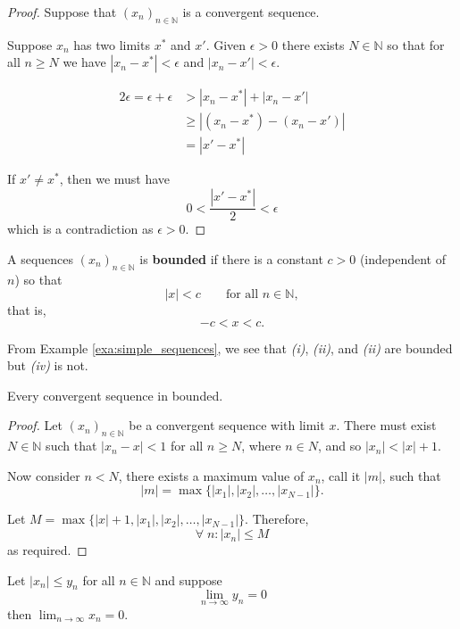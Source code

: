 \begin{proof}
    Suppose that $(x_n)_{n\in\mathbb N}$ is a convergent sequence.
    
    Suppose $x_n$ has two limits $x^*$ and $x'$. Given $\epsilon>0$ there exists $N\in\mathbb N$ so that for all $n\geq N$ we have $|x_n-x^*|<\epsilon$ and $|x_n-x'|<\epsilon$.
    
    \begin{align*}
        2\epsilon=\epsilon+\epsilon&>|x_n-x^*|+|x_n-x'|\\
        &\geq|(x_n-x^*)-(x_n-x')|\\
        &=|x'-x^*|
    \end{align*}
    
    If $x'\neq x^*$, then we must have \[0<\dfrac{|x'-x^*|}{2}<\epsilon\] which is a contradiction as $\epsilon>0$.
\end{proof}

\begin{definition}
    A sequences $(x_n)_{n\in\mathbb N}$ is \textbf{bounded} if there is a constant $c>0$ (independent of $n$) so that \[|x|<c\qquad \text{for all } n\in\mathbb N,\] that is, \[-c<x<c.\]
\end{definition}

From Example \ref{exa:simple_sequences}, we see that \emph{(i)}, \emph{(ii)}, and \emph{(ii)} are bounded but \emph{(iv)} is not.

\begin{theorem}
    Every convergent sequence in bounded.
\end{theorem}

\begin{proof}
    Let $(x_n)_{n\in\mathbb N}$ be a convergent sequence with limit $x$. There must exist $N\in\mathbb N$ such that $|x_n-x|<1$ for all $n\geq N$, where $n\in N$, and so $|x_n|<|x|+1$.
    
    Now consider $n<N$, there exists a maximum value of $x_n$, call it $|m|$, such that \[|m|=\max{\{|x_1|,|x_2|,\ldots,|x_{N-1}|\}}.\]
    
        Let $M=\max{\{|x|+1,|x_1|,|x_2|,\ldots,|x_{N-1}|\}}$. Therefore, \[\forall\;n:|x_n|\leq M\] as required.
\end{proof}

\begin{theorem}\label{the:squeeze}
    Let $|x_n|\leq y_n$ for all $n\in\mathbb N$ and suppose \[\lim_{n\to\infty}{y_n}=0\] then $\lim_{n\to\infty}{x_n}=0$.
\end{theorem}

